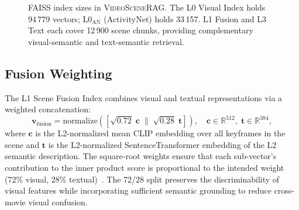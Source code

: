 \documentclass[11pt]{article}
\newcommand{\system}{\textsc{VideoSceneRAG}}
\begin{document}
\begin{figure}[!htb]
\centering
{}
\caption{FAISS index sizes in \system.  The L0 Visual Index holds
94\,779 vectors; L0$_\text{AN}$ (ActivityNet) holds 33\,157.
L1 Fusion and L3 Text each cover 12\,900 scene chunks, providing
complementary visual-semantic and text-semantic retrieval.}
\label{fig:index_sizes}
\end{figure}

\subsection{Fusion Weighting}

The L1 Scene Fusion Index combines visual and textual representations via a
weighted concatenation:
\begin{equation}
  \mathbf{v}_\text{fusion}
  = \mathrm{normalize}\!\left(\left[
      \sqrt{0.72}\;\mathbf{c} \;\Big\|\; \sqrt{0.28}\;\mathbf{t}
    \right]\right),
  \quad \mathbf{c}\in\mathbb{R}^{512},\;\mathbf{t}\in\mathbb{R}^{384},
  \label{eq:fusion}
\end{equation}
where $\mathbf{c}$ is the L2-normalized mean CLIP embedding over all
keyframes in the scene and $\mathbf{t}$ is the L2-normalized
SentenceTransformer embedding of the L2 semantic description.  The
square-root weights ensure that each sub-vector's contribution to the inner
product score is proportional to the intended weight (72\% visual,
28\% textual)~\cite{faiss}.  The 72/28 split preserves the discriminability
of visual features while incorporating sufficient semantic grounding to reduce
cross-movie visual confusion.
\end{document}
